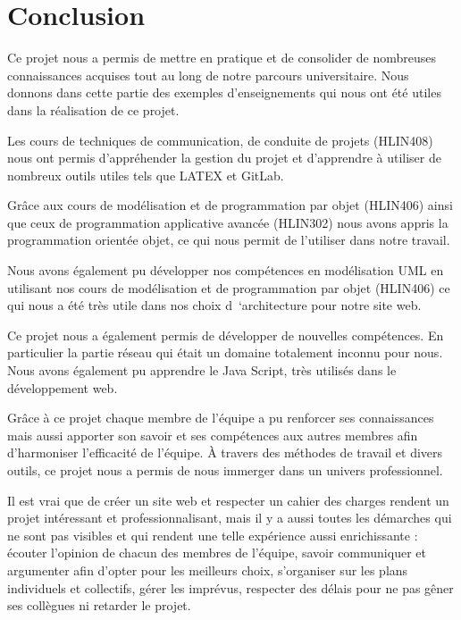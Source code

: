 \documentclass[12pt, openany]{report}
\begin{document}
\chapter{Conclusion}
Ce projet nous a permis de mettre en pratique et de consolider de nombreuses connaissances acquises tout au long de notre parcours universitaire. Nous donnons dans cette partie des exemples d’enseignements qui nous ont été utiles dans la réalisation de ce projet.\newline

Les cours de techniques de communication, de conduite de projets (HLIN408) nous ont permis d’appréhender la gestion du projet et d’apprendre à utiliser de nombreux outils utiles tels que LATEX et GitLab.

Grâce aux cours de modélisation et de programmation par objet (HLIN406) ainsi que ceux de programmation applicative avancée (HLIN302) nous avons appris la programmation orientée objet, ce qui nous permit de l’utiliser dans notre travail.

Nous avons également pu développer nos compétences en modélisation UML en utilisant nos cours de modélisation et de programmation par objet (HLIN406) ce qui nous a été très utile dans nos choix d ‘architecture pour notre site web.\newline 

Ce projet nous a également permis de développer de nouvelles compétences. En particulier la partie réseau qui était un domaine totalement inconnu pour nous. Nous avons également pu apprendre le Java Script, très utilisés dans le développement web.\newline

Grâce à ce projet chaque membre de l’équipe a pu renforcer ses connaissances mais aussi apporter son savoir et ses compétences aux autres membres afin d’harmoniser l’efficacité de l’équipe.
À travers des méthodes de travail et divers outils, ce projet nous a permis de nous immerger dans un univers professionnel.\newline

Il est vrai que de créer un site web et respecter un cahier des charges rendent un projet intéressant et professionnalisant, mais il y a aussi toutes les démarches qui ne sont pas visibles et qui rendent une telle expérience aussi enrichissante : écouter l’opinion de chacun des membres de l’équipe, savoir communiquer et argumenter afin d’opter pour les meilleurs choix, s’organiser sur les plans individuels et collectifs, gérer les imprévus, respecter des délais pour ne pas gêner ses collègues ni retarder le projet.\newline
\end{document}

